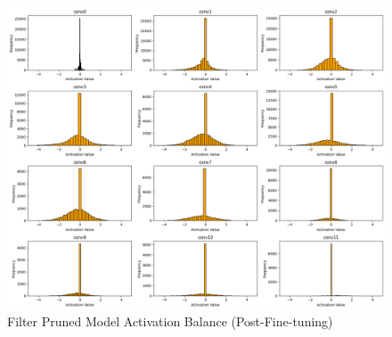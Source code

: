 \documentclass[12pt]{article}
\begin{document}
\begin{figure}[h]
  \centering
  \includegraphics[width=1\linewidth]{report_images/filter_act_ft.png}
  \caption{\label{fig:filter_act_dist_ft}Filter Pruned Model Activation Balance (Post-Fine-tuning)}
\end{figure}
\FloatBarrier
\end{document}
